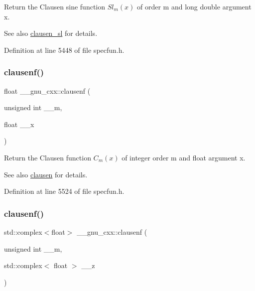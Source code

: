Return the Clausen sine function $ Sl_m(x) $ of order {\ttfamily m} and {\ttfamily long double} argument {\ttfamily x}.

\begin{DoxySeeAlso}{See also}
\hyperlink{group__mathsf__gnu_gacb757b00309213cd96bb2bc6b5dc3c24}{clausen\+\_\+sl} for details. 
\end{DoxySeeAlso}


Definition at line 5448 of file specfun.\+h.

\mbox{\label{group__mathsf__gnu_ga6422bdec1a3c930fb1623094cd2eaff2}} 
\subsubsection{\texorpdfstring{clausenf()}{clausenf()}\hspace{0.1cm}{\footnotesize\ttfamily [1/2]}}
{\footnotesize\ttfamily float \+\_\+\+\_\+gnu\+\_\+cxx\+::clausenf (\begin{DoxyParamCaption}\item[{unsigned int}]{\+\_\+\+\_\+m,  }\item[{float}]{\+\_\+\+\_\+x }\end{DoxyParamCaption})\hspace{0.3cm}{\ttfamily [inline]}}

Return the Clausen function $ C_m(x) $ of integer order {\ttfamily m} and {\ttfamily float} argument {\ttfamily x}.

\begin{DoxySeeAlso}{See also}
\hyperlink{group__mathsf__gnu_ga54e4ba71b1f81718d6998349f91ff88f}{clausen} for details. 
\end{DoxySeeAlso}


Definition at line 5524 of file specfun.\+h.

\mbox{\label{group__mathsf__gnu_ga98b5ba1e5de4ef2e0e9422ac8d9ce2ad}} 
\subsubsection{\texorpdfstring{clausenf()}{clausenf()}\hspace{0.1cm}{\footnotesize\ttfamily [2/2]}}
{\footnotesize\ttfamily std\+::complex$<$float$>$ \+\_\+\+\_\+gnu\+\_\+cxx\+::clausenf (\begin{DoxyParamCaption}\item[{unsigned int}]{\+\_\+\+\_\+m,  }\item[{std\+::complex$<$ float $>$}]{\+\_\+\+\_\+z }\end{DoxyParamCaption})\hspace{0.3cm}{\ttfamily [inline]}}

